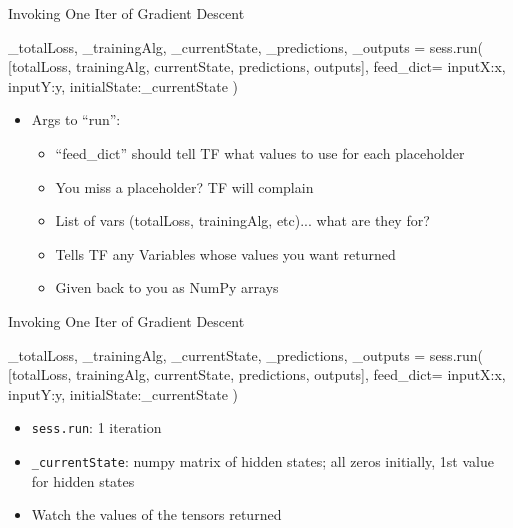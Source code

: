 \documentclass[aspectratio=169]{beamer}
\begin{document}
\begin{frame}[fragile]{Invoking One Iter of Gradient Descent}

\begin{SQL}
_totalLoss, _trainingAlg, _currentState, 
     _predictions, _outputs = sess.run(
    [totalLoss, trainingAlg, currentState, 
     predictions, outputs],
    feed_dict={
         inputX:x,
         inputY:y,
         initialState:_currentState
    })
\end{SQL}

\begin{itemize}
\item Args to ``run'':
	\begin{itemize}
	\item ``feed\_dict'' should tell TF what values to use for each placeholder
	\item You miss a placeholder?  TF will complain
	\item List of vars (totalLoss, trainingAlg, etc)... what are they for?
	\item Tells TF any Variables whose values you want returned
	\item Given back to you as NumPy arrays
	\end{itemize}
\end{itemize}
\end{frame}
\begin{frame}[fragile]{Invoking One Iter of Gradient Descent}

\begin{SQL}
_totalLoss, _trainingAlg, _currentState, 
     _predictions, _outputs = sess.run(
    [totalLoss, trainingAlg, currentState, 
     predictions, outputs],
    feed_dict={
         inputX:x,
         inputY:y,
         initialState:_currentState
    })
\end{SQL}

\begin{itemize}
\item \texttt{sess.run}: 1 iteration
\item \texttt{\_currentState}: numpy matrix of hidden states; all zeros initially, 1st value for hidden states
\item Watch the values of the tensors returned
\end{itemize}
\end{frame}
\end{document}
